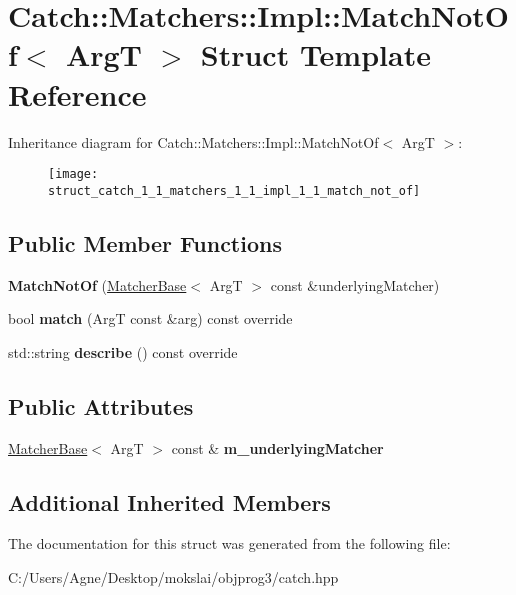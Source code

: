 \hypertarget{struct_catch_1_1_matchers_1_1_impl_1_1_match_not_of}{}\section{Catch\+:\+:Matchers\+:\+:Impl\+:\+:Match\+Not\+Of$<$ ArgT $>$ Struct Template Reference}
\label{struct_catch_1_1_matchers_1_1_impl_1_1_match_not_of}
Inheritance diagram for Catch\+:\+:Matchers\+:\+:Impl\+:\+:Match\+Not\+Of$<$ ArgT $>$\+:\begin{figure}[H]
\begin{center}
\leavevmode
\texttt{[image: struct\_catch\_1\_1\_matchers\_1\_1\_impl\_1\_1\_match\_not\_of]}
\end{center}
\end{figure}
\subsection*{Public Member Functions}
\begin{DoxyCompactItemize}
\item 
\mbox{\label{struct_catch_1_1_matchers_1_1_impl_1_1_match_not_of_a47afdd9e4c3354cef85adc3186097ae4}} 
{\bfseries Match\+Not\+Of} (\mbox{\hyperlink{struct_catch_1_1_matchers_1_1_impl_1_1_matcher_base}{Matcher\+Base}}$<$ ArgT $>$ const \&underlying\+Matcher)
\item 
\mbox{\label{struct_catch_1_1_matchers_1_1_impl_1_1_match_not_of_a181d693c0258e582d80dc6117a1f2b66}} 
bool {\bfseries match} (ArgT const \&arg) const override
\item 
\mbox{\label{struct_catch_1_1_matchers_1_1_impl_1_1_match_not_of_ac5fb4ef6a9069d23a4098c3c818f06b0}} 
std\+::string {\bfseries describe} () const override
\end{DoxyCompactItemize}
\subsection*{Public Attributes}
\begin{DoxyCompactItemize}
\item 
\mbox{\label{struct_catch_1_1_matchers_1_1_impl_1_1_match_not_of_af7ac67f112b0e93796b048a47329aad4}} 
\mbox{\hyperlink{struct_catch_1_1_matchers_1_1_impl_1_1_matcher_base}{Matcher\+Base}}$<$ ArgT $>$ const  \& {\bfseries m\+\_\+underlying\+Matcher}
\end{DoxyCompactItemize}
\subsection*{Additional Inherited Members}


The documentation for this struct was generated from the following file\+:\begin{DoxyCompactItemize}
\item 
C\+:/\+Users/\+Agne/\+Desktop/mokslai/objprog3/catch.\+hpp\end{DoxyCompactItemize}
